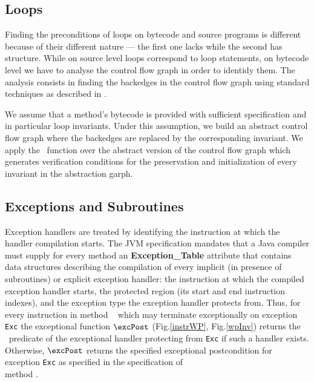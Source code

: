 \subsection{Loops}
Finding the preconditions of loops on bytecode and source programs is different because of their different nature --- 
the first one lacks while the second has structure. While on source level loops correspond to loop statements,  
on bytecode level we have to analyse the control flow graph in order to identidy them.
 The analysis consists in finding the backedges in the control flow graph using standard techniques as described in \cite{ARUCom1986}. 
  
 We assume that a method's bytecode is provided with sufficient specification and in particular loop invariants.
 Under this assumption, we build an abstract control flow graph where the backedges are replaced by
 the corresponding invariant. We apply the \wpi \ function over the abstract version of the control flow graph which generates verification conditions for the 
preservation and initialization of every invariant in the abstraction garph. 


     
\subsection{Exceptions and Subroutines}

Exception handlers are treated by identifying the instruction at which the handler compilation starts. The JVM specification mandates 
that a Java compiler must supply for every method an \textbf{Exception\_Table} attribute that contains data structures describing the compilation of
 every implicit (in presence of subroutines) or explicit exception handler: the instruction at which the compiled exception handler starts,
 the protected region (its start and end instruction indexes), and the exception type the exception handler protects from. Thus, 
for every instruction  in method \method~ which may terminate exceptionally on exception \texttt{Exc} the exceptional function
 $\excPost$ (Fig.\ref{instrWP}, Fig.\ref{wpInv}) returns the \wpi \ predicate of the exceptional handler protecting  from \texttt{Exc} if such a handler exists.
Otherwise, $\excPost$ returns the specified exceptional postcondition for exception \texttt{Exc} as specified in the specification of \\
method \method.

